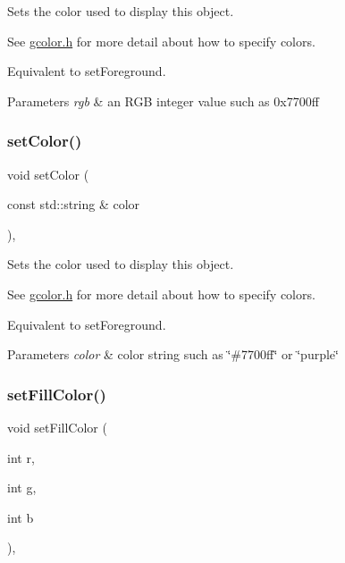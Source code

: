 Sets the color used to display this object. 

See \mbox{\hyperlink{gcolor_8h_source}{gcolor.\+h}} for more detail about how to specify colors.

Equivalent to set\+Foreground.


\begin{DoxyParams}{Parameters}
{\em rgb} & an R\+GB integer value such as 0x7700ff \\
\hline
\end{DoxyParams}
\mbox{\label{classsgl_1_1GObject_a61374df6c11b52cfbb0815decdbaebc6}} 
\subsubsection{\texorpdfstring{set\+Color()}{setColor()}\hspace{0.1cm}{\footnotesize\ttfamily [3/3]}}
{\footnotesize\ttfamily void set\+Color (\begin{DoxyParamCaption}\item[{const std\+::string \&}]{color }\end{DoxyParamCaption})\hspace{0.3cm}{\ttfamily [virtual]}, {\ttfamily [inherited]}}



Sets the color used to display this object. 

See \mbox{\hyperlink{gcolor_8h_source}{gcolor.\+h}} for more detail about how to specify colors.

Equivalent to set\+Foreground.


\begin{DoxyParams}{Parameters}
{\em color} & color string such as \char`\"{}\#7700ff\char`\"{} or \char`\"{}purple\char`\"{} \\
\hline
\end{DoxyParams}
\mbox{\label{classsgl_1_1GObject_ad767a33971159e9493e221cca4c00ae9}} 
\subsubsection{\texorpdfstring{set\+Fill\+Color()}{setFillColor()}\hspace{0.1cm}{\footnotesize\ttfamily [1/3]}}
{\footnotesize\ttfamily void set\+Fill\+Color (\begin{DoxyParamCaption}\item[{int}]{r,  }\item[{int}]{g,  }\item[{int}]{b }\end{DoxyParamCaption})\hspace{0.3cm}{\ttfamily [virtual]}, {\ttfamily [inherited]}}



